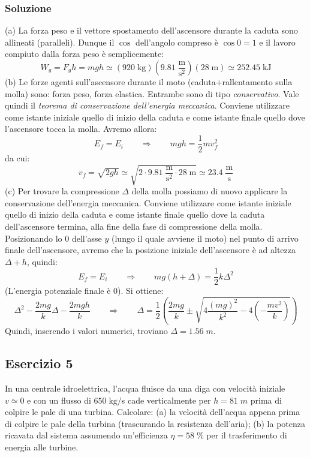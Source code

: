 \documentclass[12pt,a4paper]{book}
\begin{document}
\subsubsection*{Soluzione}
(a) La forza peso e il vettore spostamento dell'ascensore durante la caduta sono allineati (paralleli). Dunque il $\cos$ dell'angolo compreso è $\cos 0=1$ e il lavoro compiuto dalla forza peso è semplicemente:
\begin{equation*}
W_{g}= F_{g} h= mg h \simeq (920 \;\text{kg})(9.81\; \frac{\text{m}}{\text{s}^2})(28\; \text{m}) \simeq 252.45 \; \text{kJ}
\end{equation*}
(b) Le forze agenti sull'ascensore durante il moto (caduta+rallentamento sulla molla) sono: forza peso, forza elastica. Entrambe sono di tipo \textit{conservativo}. Vale quindi il \textit{teorema di conservazione dell'energia meccanica}.
Conviene utilizzare come istante iniziale quello di inizio della caduta e come istante finale quello dove l'ascensore tocca la molla. 
Avremo allora:
\begin{equation*}
E_{f}=E_{i} \qquad  \Rightarrow \qquad mgh=\frac{1}{2} m v_{f}^2
\end{equation*}
da cui:
\begin{equation*}
v_{f}=\sqrt{2gh}\simeq\sqrt{2\cdot 9.81\; \frac{\text{m}}{\text{s}^2}\cdot 28\; \text{m}} \simeq 23.4 \; \frac{\text{m}}{\text{s}}
\end{equation*}
(c) Per trovare la compressione $\Delta$ della molla possiamo di nuovo applicare la conservazione dell'energia meccanica.
Conviene utilizzare come istante iniziale quello di inizio della caduta e come istante finale quello dove la caduta dell'ascensore termina, alla fine della fase di compressione della molla. Posizionando lo $0$ dell'asse $y$ (lungo il quale avviene il moto) 
nel punto di arrivo finale dell'ascensore, avremo che la posizione iniziale dell'ascensore è ad altezza $\Delta + h$, quindi:
\begin{equation*}
E_{f}=E_{i} \qquad  \Rightarrow \qquad mg(h+\Delta)=\frac{1}{2}k \Delta^{2} 
\end{equation*}
(L'energia potenziale finale è 0). Si ottiene:
\begin{equation*}
\Delta^2-\frac{2mg}{k}\Delta-\frac{2mgh}{k}\qquad \Rightarrow \qquad \Delta=\frac{1}{2}\left(\frac{2mg}{k}\pm\sqrt{4\frac{(mg)^2}{k^2}-4\left(-\frac{mv^2}{k}\right)}\right)
\end{equation*}
Quindi, inserendo i valori numerici, troviano $\Delta=1.56\;m$. 

\subsection*{Esercizio 5}
In una centrale idroelettrica, l'acqua fluisce da una diga con velocità iniziale $v\simeq 0$ e con un flusso di $650\; \text{kg}/$s cade verticalmente per $h= 81\; m$ prima di colpire le pale di una turbina. Calcolare: (a) la velocità dell'acqua appena prima di colpire le pale della turbina (trascurando la resistenza dell'aria); (b) la potenza ricavata dal sistema assumendo un'efficienza $\eta =58\; \%$ per il trasferimento di energia alle turbine. 
\end{document}
